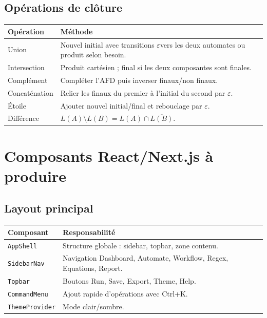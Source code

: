 \documentclass[11pt,a4paper]{report}
\newcommand{\code}[1]{\texttt{#1}}
\newcommand{\eps}{\ensuremath{\varepsilon}}
\begin{document}
\section{Opérations de clôture}
\begin{longtable}{p{}p{}}
\toprule
\textbf{Opération} & \textbf{Méthode}\\
\midrule
Union & Nouvel initial avec transitions \eps vers les deux automates ou produit selon besoin.\\
Intersection & Produit cartésien ; final si les deux composantes sont finales.\\
Complément & Compléter l'AFD puis inverser finaux/non finaux.\\
Concaténation & Relier les finaux du premier à l'initial du second par \eps.\\
Étoile & Ajouter nouvel initial/final et rebouclage par \eps.\\
Différence & $L(A) \setminus L(B)=L(A) \cap \overline{L(B)}$.\\
\bottomrule
\end{longtable}

\chapter{Composants React/Next.js à produire}

\section{Layout principal}
\begin{longtable}{p{}p{}}
\toprule
\textbf{Composant} & \textbf{Responsabilité}\\
\midrule
\code{AppShell} & Structure globale : sidebar, topbar, zone contenu.\\
\code{SidebarNav} & Navigation Dashboard, Automate, Workflow, Regex, Equations, Report.\\
\code{Topbar} & Boutons Run, Save, Export, Theme, Help.\\
\code{CommandMenu} & Ajout rapide d'opérations avec Ctrl+K.\\
\code{ThemeProvider} & Mode clair/sombre.\\
\bottomrule
\end{longtable}
\end{document}
